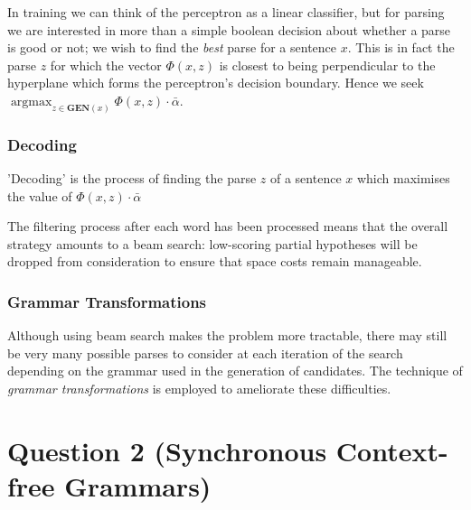 \documentclass[11pt]{article}
\begin{document}
In training we can think of the perceptron as a linear classifier, but for
parsing we are interested in more than a simple boolean decision about whether
a parse is good or not; we wish to find the \emph{best} parse for a sentence
$x$. This is in fact the parse $z$ for which the vector $\Phi(x, z)$ is closest
to being perpendicular to the hyperplane which forms the perceptron's decision
boundary. Hence we seek $\operatorname{arg max}_{z \in \textbf{GEN}(x)} \Phi(x, z) \cdot \bar{\alpha}$.

\subsubsection*{Decoding}

'Decoding' is the process of finding the parse $z$ of a sentence $x$ which maximises the value of $\Phi(x,z) \cdot \bar{\alpha}$

The filtering process after each word has been processed means that the overall
strategy amounts to a beam search: low-scoring partial hypotheses will be
dropped from consideration to ensure that space costs remain manageable.

\subsubsection*{Grammar Transformations}

Although using beam search makes the problem more tractable, there may still be
very many possible parses to consider at each iteration of the search depending
on the grammar used in the generation of candidates. The technique of
\emph{grammar transformations} is employed to ameliorate these difficulties.











\section*{Question 2 (Synchronous Context-free Grammars)}
\end{document}
